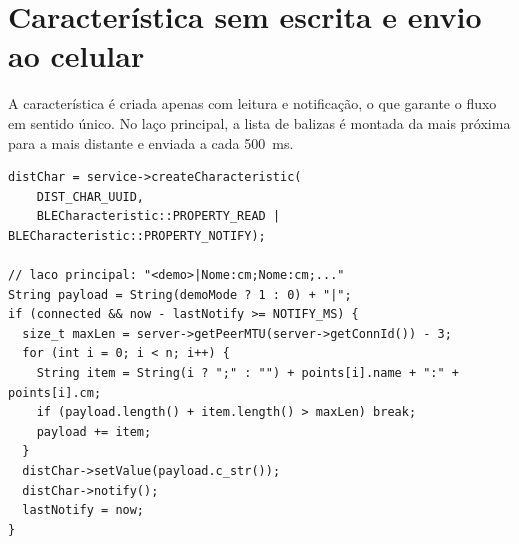 \section{Característica sem escrita e envio ao celular}

A característica é criada apenas com leitura e notificação, o que garante o fluxo em sentido único. No laço principal, a lista de balizas é montada da mais próxima para a mais distante e enviada a cada 500~ms.

\begin{lstlisting}
distChar = service->createCharacteristic(
    DIST_CHAR_UUID,
    BLECharacteristic::PROPERTY_READ | BLECharacteristic::PROPERTY_NOTIFY);

// laco principal: "<demo>|Nome:cm;Nome:cm;..."
String payload = String(demoMode ? 1 : 0) + "|";
if (connected && now - lastNotify >= NOTIFY_MS) {
  size_t maxLen = server->getPeerMTU(server->getConnId()) - 3;
  for (int i = 0; i < n; i++) {
    String item = String(i ? ";" : "") + points[i].name + ":" + points[i].cm;
    if (payload.length() + item.length() > maxLen) break;
    payload += item;
  }
  distChar->setValue(payload.c_str());
  distChar->notify();
  lastNotify = now;
}
\end{lstlisting}
